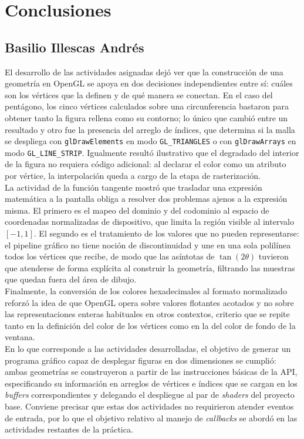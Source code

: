\section{Conclusiones}
        
    \subsection{Basilio Illescas Andrés}

    El desarrollo de las actividades asignadas dejó ver que la construcción de una geometría en OpenGL se apoya en dos decisiones independientes entre sí: cuáles son los vértices que la definen y de qué manera se conectan. En el caso del pentágono, los cinco vértices calculados sobre una circunferencia bastaron para obtener tanto la figura rellena como su contorno; lo único que cambió entre un resultado y otro fue la presencia del arreglo de índices, que determina si la malla se despliega con \texttt{glDrawElements} en modo \texttt{GL\_TRIANGLES} o con \texttt{glDrawArrays} en modo \texttt{GL\_LINE\_STRIP}. Igualmente resultó ilustrativo que el degradado del interior de la figura no requiera código adicional: al declarar el color como un atributo por vértice, la interpolación queda a cargo de la etapa de rasterización.\\

    La actividad de la función tangente mostró que trasladar una expresión matemática a la pantalla obliga a resolver dos problemas ajenos a la expresión misma. El primero es el mapeo del dominio y del codominio al espacio de coordenadas normalizadas de dispositivo, que limita la región visible al intervalo $[-1, 1]$. El segundo es el tratamiento de los valores que no pueden representarse: el pipeline gráfico no tiene noción de discontinuidad y une en una sola polilínea todos los vértices que recibe, de modo que las asíntotas de $\tan(2\theta)$ tuvieron que atenderse de forma explícita al construir la geometría, filtrando las muestras que quedan fuera del área de dibujo.\\

    Finalmente, la conversión de los colores hexadecimales al formato normalizado reforzó la idea de que OpenGL opera sobre valores flotantes acotados y no sobre las representaciones enteras habituales en otros contextos, criterio que se repite tanto en la definición del color de los vértices como en la del color de fondo de la ventana.\\

    En lo que corresponde a las actividades desarrolladas, el objetivo de generar un programa gráfico capaz de desplegar figuras en dos dimensiones se cumplió: ambas geometrías se construyeron a partir de las instrucciones básicas de la API, especificando su información en arreglos de vértices e índices que se cargan en los \textit{buffers} correspondientes y delegando el despliegue al par de \textit{shaders} del proyecto base. Conviene precisar que estas dos actividades no requirieron atender eventos de entrada, por lo que el objetivo relativo al manejo de \textit{callbacks} se abordó en las actividades restantes de la práctica.\\

